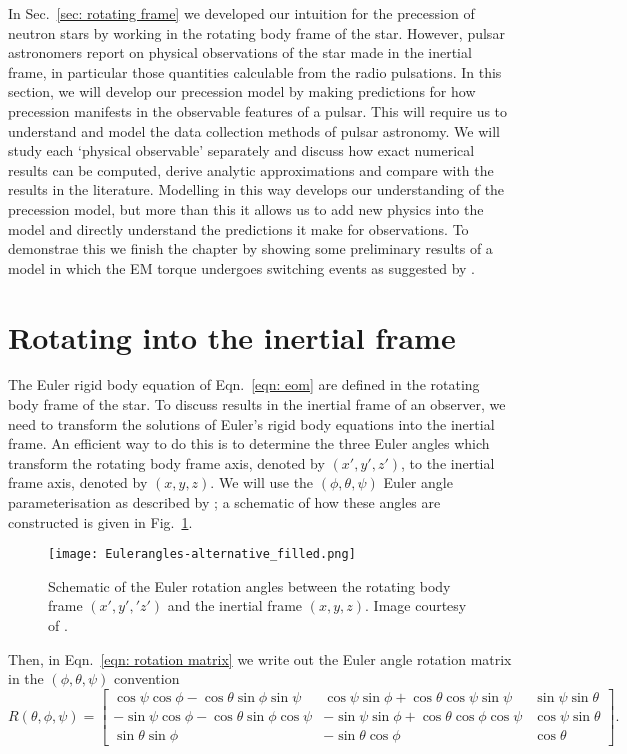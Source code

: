 \documentclass[../full_thesis/full_thesis.tex]{subfiles}
\begin{document}
In Sec.~\ref{sec: rotating frame} we developed our intuition for the precession
of neutron stars by working in the rotating body frame of the star.  However,
pulsar astronomers report on physical observations of the star made in the
inertial frame, in particular those quantities calculable from the radio
pulsations. In this section, we will develop our precession model by making
predictions for how precession manifests in the observable features of a
pulsar. This will require us to understand and model the data collection
methods of pulsar astronomy. We will study each `physical observable' separately
and discuss how exact numerical results can be computed, derive analytic
approximations and compare with the results in the literature.
Modelling in this way develops our understanding of the precession model, but
more than this it allows us to add new physics into the model and directly
understand the predictions it make for observations. To demonstrae this we
finish the chapter by showing some preliminary results of a model in which the
EM torque undergoes switching events as suggested by \citet{Lyne2010}.

\section{Rotating into the inertial frame}

The Euler rigid body equation of Eqn.~\eqref{eqn: eom} are defined in the
rotating body frame of the star. To discuss results in the inertial frame of an
observer, we need to transform the solutions of Euler's rigid body equations
into the inertial frame.  An efficient way to do this is to determine the three
Euler angles which transform the rotating body frame axis, denoted by $(x',y',
z')$, to the inertial frame axis, denoted by $(x, y, z)$. We will use the
$(\phi, \theta, \psi)$ Euler
angle parameterisation as described by \citet{Landau1969}; a schematic of how
these angles are constructed is given in Fig.~\ref{fig: Euler}.
\begin{figure}[ht]
\centering
\texttt{[image: Eulerangles-alternative\_filled.png]}
\caption{Schematic of the Euler rotation angles between the rotating body
frame $(x', y', 'z')$ and the inertial frame $(x, y, z)$. Image courtesy of
 \citet{WikipediaEuler}.}
\label{fig: Euler}
\end{figure}
Then, in Eqn.~\eqref{eqn: rotation matrix} we write out the Euler angle
rotation matrix in the $(\phi, \theta, \psi)$ convention
\begin{equation}
R(\theta, \phi, \psi) = \left[
\begin{array}{ccc}
\cos\psi \cos\phi - \cos\theta \sin\phi \sin \psi &
\cos\psi \sin \phi + \cos\theta \cos \psi \sin \psi &
\sin \psi \sin\theta \\
-\sin\psi \cos\phi - \cos\theta\sin\phi\cos\psi &
-\sin\psi\sin\phi + \cos\theta\cos\phi\cos\psi &
\cos\psi \sin\theta \\
\sin\theta\sin\phi &
-\sin\theta \cos\phi &
\cos\theta
\end{array}
\right].
\label{eqn: rotation matrix}
\end{equation}
\end{document}
